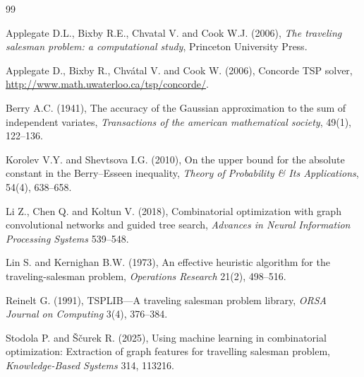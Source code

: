 \documentclass[twoside]{article}
\begin{document}
	\begin{thebibliography}{99}

		

		Applegate D.L., Bixby R.E., Chvatal V. and Cook W.J. (2006), {\it The traveling salesman problem: a computational study}, Princeton University Press.

		

		Applegate D., Bixby R., Chv\'atal V. and Cook W. (2006), Concorde {TSP} solver, \url{http://www.math.uwaterloo.ca/tsp/concorde/}.

		

		Berry A.C. (1941), The accuracy of the Gaussian approximation to the sum of independent variates, {\it Transactions of the american mathematical society}, 49(1), 122--136.

		

		Korolev V.Y. and Shevtsova I.G. (2010), On the upper bound for the absolute constant in the Berry–Esseen inequality, {\it Theory of Probability \& Its Applications}, 54(4), 638--658.

								

		Li Z., Chen Q. and Koltun V. (2018), Combinatorial optimization with graph convolutional networks and guided tree search, {\it Advances in Neural Information Processing Systems} 539--548.

		

		Lin S. and Kernighan B.W. (1973), An effective heuristic algorithm for the traveling-salesman problem, {\it Operations Research} 21(2), 498--516.

		


		

		Reinelt G. (1991), TSPLIB---A traveling salesman problem library, {\it ORSA Journal on Computing} 3(4), 376--384.

		

		Stodola P. and \v{S}\v{c}urek R. (2025), Using machine learning in combinatorial optimization: Extraction of graph features for travelling salesman problem, {\it Knowledge-Based Systems} 314, 113216.


\end{thebibliography}
\end{document}
